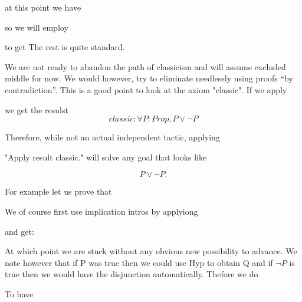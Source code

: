 

at this point we have 


so we will employ 

to get
 The rest is quite standard.

We are not ready to abandon the path of classicism and will assume excluded middle for now. We would however, try to eliminate needlessly using proofs ``by contradiction''.
This is a good point to look at the axiom "classic". If we apply

we get the resulst $$classic
    : \forall  P : Prop, P \lor \neg P$$


Therefore, while not an actual independent tactic, applying

"Apply result classic."
will solve any goal that looks like

$$P \lor \neg P.$$

For example let us prove that 

We of course first use implication intros by applyiong

and get:


At which point we are stuck without any obvious new possibility to advance. We note however that if P was true then we could use Hyp to obtain Q and if $\neg P$ is true then we would have the disjunction automatically. Thefore we do

 


To have



